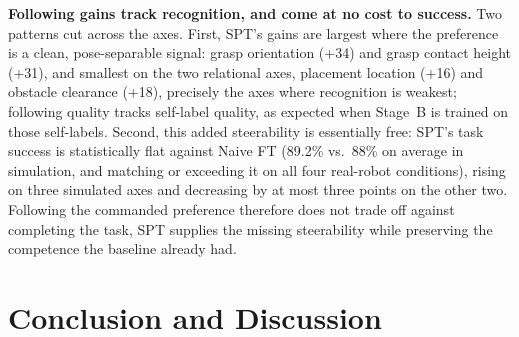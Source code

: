 \documentclass{article}
\begin{document}
\textbf{Following gains track recognition, and come at no cost to success.}
Two patterns cut across the axes. First, SPT's gains are largest where the
preference is a clean, pose-separable signal: grasp orientation (+34) and grasp
contact height (+31), and smallest on the two relational axes, placement location
(+16) and obstacle clearance (+18), precisely the axes where recognition is
weakest; following quality tracks self-label quality, as expected when Stage~B is
trained on those self-labels. Second, this added steerability is essentially free:
SPT's task success is statistically flat against Naive FT (89.2\% vs.\ 88\% on
average in simulation, and matching or exceeding it on all four real-robot
conditions), rising on three simulated axes and decreasing by at most three points on
the other two. Following the commanded preference therefore does not trade off
against completing the task, SPT supplies the missing steerability while
preserving the competence the baseline already had.









\section{Conclusion and Discussion}
\label{sec:conclusion_discussion}
\end{document}
